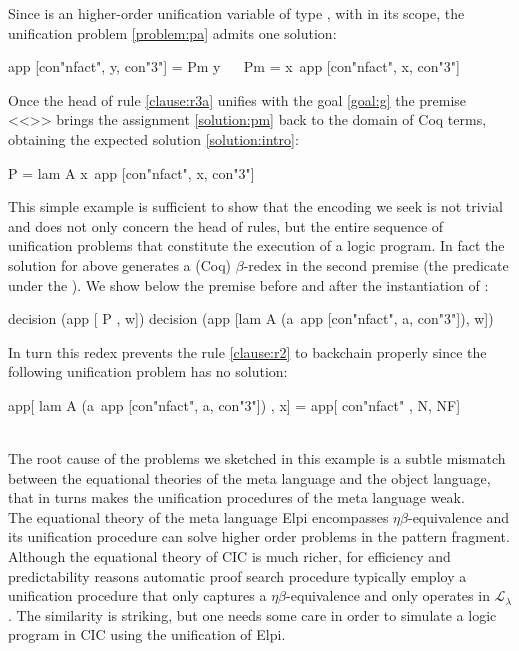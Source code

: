 \documentclass[sigconf,natbib=false,review]{acmart}
\newcommand{\llambda}{\ensuremath{\mathcal{L}_\lambda}\xspace}
\begin{document}
\noindent
Since  is an higher-order unification variable
of type ,
with 
in its scope, the unification problem \ref{problem:pa}
admits one solution:

\begin{elpicode}
app [con"nfact", y, con"3"] = Pm y                    ~~
Pm = x\ app [con"nfact", x, con"3"]                   ~~
\end{elpicode}

\noindent
Once the head of rule \ref{clause:r3a} unifies with the goal \ref{goal:g}
the premise <<>> brings the assignment \ref{solution:pm}
back to the domain  of Coq terms, obtaining the expected solution
\ref{solution:intro}:

\begin{elpicode}
P = lam A x\ app [con"nfact", x, con"3"]
\end{elpicode}

\noindent
This simple example is sufficient to show that the encoding we seek
is not trivial and does not only concern the head of rules, but the entire sequence
of unification problems that constitute the execution of a logic program.
In fact
the solution for  above generates a
(Coq) $\beta$-redex in the second premise (the predicate
under the \hspace{-0.4em}). We show below the premise before and
after the instantiation of :

\begin{elpicode}
decision (app [                   P                  , w])
decision (app [lam A (a\ app [con"nfact", a, con"3"]), w])
\end{elpicode}

\noindent
In turn this redex prevents the rule \ref{clause:r2} to backchain properly since
the following unification problem has no solution:

\begin{elpicode}
app[ lam A (a\ app [con"nfact", a, con"3"]) , x] =
app[ con"nfact"                             , N, NF]
\end{elpicode}
\noindent
~\\
The root cause of the problems we sketched in this example
is a subtle mismatch between the equational theories of the meta language
and the object language, that in turns makes the 
unification procedures of the meta language weak.\\
The equational theory of the meta language Elpi encompasses
$\eta\beta$-equivalence and its unification procedure can solve higher order
problems in the pattern fragment. Although 
the equational theory of CIC is much richer, for efficiency and predictability
reasons automatic proof search procedure typically employ a unification
procedure that only captures a $\eta\beta$-equivalence and only operates
in \llambda. The similarity is striking, but one needs some care in order to
simulate a logic program in CIC using the unification of Elpi.
\end{document}
